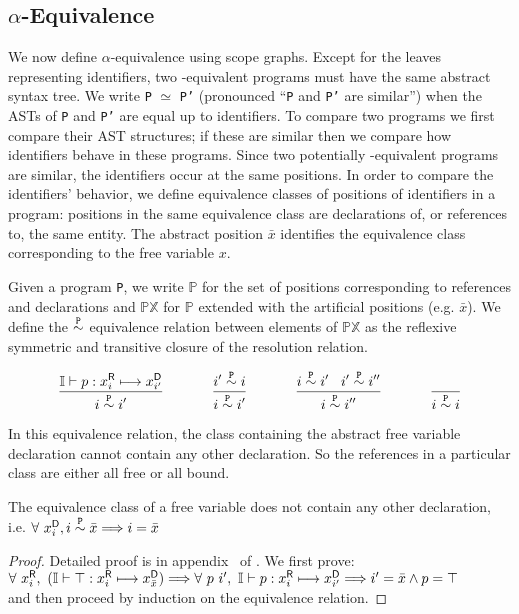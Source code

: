\subsection{$\alpha$-Equivalence}
We now define $\alpha$-equivalence using scope graphs. Except for the leaves representing identifiers, two \a-equivalent programs must have the same abstract syntax tree. 
We write {\tt P} $\simeq$ {\tt P'} (pronounced ``{\tt P} and {\tt P'} are similar'')
when the ASTs of {\tt P} and {\tt P'} are equal up to identifiers.
To compare two programs we first compare their AST structures; if these are similar
then we compare how identifiers behave in these programs. 
Since two potentially \a-equivalent programs are similar, the identifiers occur at the same positions. In order to compare the identifiers' behavior, we define equivalence classes of positions of identifiers in a program: positions in the same equivalence class are declarations of, or references to, the same entity. The abstract position $\bar{x}$ identifies the equivalence class corresponding to the free variable $x$. 

Given a program {\tt P}, we write $\mathbb{P}$ for the set of positions corresponding to references and declarations and $\mathbb{PX}$ for $\mathbb{P}$ extended with the artificial positions (e.g. $\bar{x}$). We define the $\stackrel{\text{\tt P}}{\sim}$ equivalence relation between elements of $\mathbb{PX}$ as the reflexive symmetric and transitive closure of the resolution relation.
\begin{definition} 
\vspace*{-\baselineskip}\medskip
      $$
      \infrulenl{ \seeni \vdash p : \ri{x}{i} \resolveau{} \di{x}{i'}}{ i \seq{\text{\tt P}} i'} \tab\tab\tab\tab
      \infrulenl{ i' \seq{\text{\tt P}} i}{ i \seq{\text{\tt P}} i'}\tab\tab\tab\tab  
      \infrulenl{ i \seq{\text{\tt P}} i' \tab i' \seq{\text{\tt P}} i''}{ i \seq{\text{\tt P}} i''} \tab\tab\tab\tab 
      \infrulenl{}{i \seq{\text{\tt P}} i}
      $$
\end{definition}
 
\noindent
In this equivalence relation, the class containing the abstract free variable declaration cannot contain any other declaration. So the references in a particular class are either all free or all bound.
\begin{lemma}\label{lemma:freevarclass} The equivalence class of a free variable does not contain any other declaration, i.e. $ \forall\ {x}^{\mbox{\scriptsize\sf D}}_{i}, i \stackrel{\text{\tt P}}{\sim} \bar{x} \Longrightarrow i = \bar{x} $
\end{lemma}
\begin{proof} Detailed proof is in appendix ~of \cite{TUD-SERG-2015-001-local}. We first prove:\\
  \tab$\forall\ \ri{x}{i},\ (\seeni \vdash \top : \ri{x}{i} \resolve \di{x}{\bar{x}}) \Longrightarrow \forall\ p\ i',\ \seeni \vdash p : \ri{x}{i} \resolveau \di{x}{i'} \Longrightarrow i' = \bar{x} \wedge p = \top$\\
and then proceed by induction on the equivalence relation. 
\end{proof}

